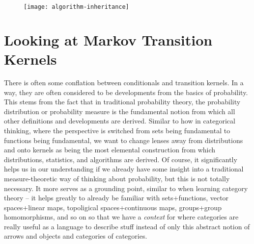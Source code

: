 \begin{table}[]
\centering
{}
\end{table}

\begin{figure}[htb]
\texttt{[image: algorithm-inheritance]}
\caption{}
\label{fig:algorithm-inheritance}
\end{figure}

\section{Looking at Markov Transition Kernels}

There is often some conflation between conditionals and transition kernels.
In a way, they are often considered to be developments from the basics of probability.
This stems from the fact that in traditional probability theory, the probability distribution or probability measure is the fundamental notion from which all other definitions and developments are derived.
Similar to how in categorical thinking, where the perspective is switched from sets being fundamental to functions being fundamental, we want to change lenses away from distributions and onto kernels as being the most elemental construction from which distributions, statistics, and algorithms are derived. 
Of course, it significantly helps us in our understanding if we already have some insight into a traditional measure-theoretic way of thinking about probability, but this is not totally necessary.
It more serves as a grounding point, similar to when learning category theory -- it helps greatly to already be familiar with sets+functions, vector spaces+linear maps, topoligical spaces+continuous maps, groups+group homomorphisms, and so on so that we have a \emph{context} for where categories are really useful as a language to describe stuff instead of only this abstract notion of arrows and objects and categories of categories.

